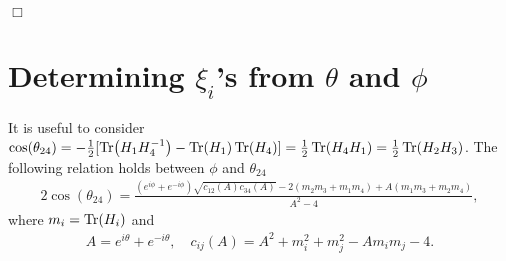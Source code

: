 \documentclass[aps,prd,notitlepage,nofootinbib,superscriptaddress,groupedaddress,twocolumn]{revtex4-1}
\def\be{\begin{eqnarray}}
\def\ee{\end{eqnarray}}
\begin{document}
	
$\Box$






\section{Determining $\xi_i$'s from $\theta$ and $\phi$}\label{thetatheta}

It is useful to consider $\cos(\theta_{24})=-\frac{1}{2}[\Tr(H_1H_4^{-1})-\Tr(H_1)\Tr(H_4)]=\frac{1}{2}\Tr(H_4H_1)=\frac{1}{2}\Tr(H_2H_3)$. The following relation holds between $\phi$ and $\theta_{24}$ \cite{Nekrasov:2011bc}
\be
2\cos(\theta_{24})=\frac{\left(e^{i\phi }+e^{-i\phi}\right) \sqrt{c_{12}(A) c_{34}(A)}-2\left(m_{2} m_{3}+m_{1} m_{4}\right)+A\left(m_{1} m_{3}+m_{2} m_{4}\right)}{A^{2}-4},\label{thetaphiE}
\ee
where $m_i=\Tr(H_i)$ and 
\be
A=e^{i\theta}+e^{-i\theta},\quad c_{i j}(A)=A^{2}+m_{i}^{2}+m_{j}^{2}-A m_{i} m_{j}-4.
\ee
\end{document}
